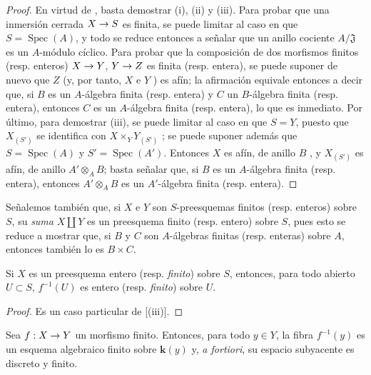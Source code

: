 \documentclass[oneside,10pt]{amsart}
\makeatletter
\newcommand{\ega@arrow}[2]{\mathchoice{#1}{#2}{#2}{#2}}
\renewcommand{\to}{\ega@arrow{\longrightarrow}{\rightarrow}}
\newcommand{\oldpage}[2][]{\marginnote{\normalfont\footnotesize\textbf{#1}~|~#2}\ignorespaces}
\let\EGAOriginalLabel\label
\renewcommand{\label}[1]{\phantomsection\EGAOriginalLabel{#1}}
\makeatother
\begin{document}
\oldpage[II]{112}
\begin{proof}
En virtud de , basta demostrar (i), (ii) y (iii).
Para probar que una inmersión cerrada $X\to S$ es finita, se puede limitar al caso en que $S=\operatorname{Spec}(A)$, y todo se reduce entonces a señalar que un anillo cociente $A/\mathfrak{J}$ es un $A$-módulo cíclico.
Para probar que la composición de dos morfismos finitos (resp. enteros) $X\to Y$, $Y\to Z$ es finita (resp. entera), se puede suponer de nuevo que $Z$ (y, por tanto, $X$ e $Y$ ) es afín; la afirmación equivale entonces a decir que, si $B$ es un $A$-álgebra finita (resp. entera) y $C$ un $B$-álgebra finita (resp. entera), entonces $C$ es un $A$-álgebra finita (resp. entera), lo que es inmediato.
Por último, para demostrar (iii), se puede limitar al caso en que $S=Y$, puesto que $X_{(S')}$ se identifica con $X\times_Y Y_{(S')}$ ;
se puede suponer además que $S=\operatorname{Spec}(A)$ y $S'=\operatorname{Spec}(A')$.
Entonces $X$ es afín, de anillo $B$ , y $X_{(S')}$ es afín, de anillo $A'\otimes_A B$; basta señalar que, si $B$ es un $A$-álgebra finita (resp. entera), entonces $A'\otimes_A B$ es un $A'$-álgebra finita (resp. entera).
\end{proof}

Señalemos también que, si $X$ e $Y$ son $S$-preesquemas finitos (resp. enteros) sobre $S$, su \emph{suma} $X\amalg Y$ es un preesquema finito (resp. entero) sobre $S$, pues esto se reduce a mostrar que, si $B$ y $C$ son $A$-álgebras finitas (resp. enteras) sobre $A$, entonces también lo es $B\times C$.

\begin{corollary}[6.1.6]
\label{II.6.1.6-fr}
Si $X$ es un preesquema entero \textup{(resp. \emph{finito})} sobre $S$, entonces, para todo abierto $U\subset S$, $f^{-1}(U)$ es entero \textup{(resp. \emph{finito})} sobre $U$.
\end{corollary}

\begin{proof}
Es un caso particular de [(iii)].
\end{proof}

\begin{corollary}[6.1.7]
\label{II.6.1.7-fr}
Sea $f:X\to Y$ un morfismo finito.
Entonces, para todo $y\in Y$, la fibra $f^{-1}(y)$ es un esquema algebraico finito sobre $\boldsymbol{k}(y)$ y, \emph{a fortiori}, su espacio subyacente es discreto y finito.
\end{corollary}
\end{document}

